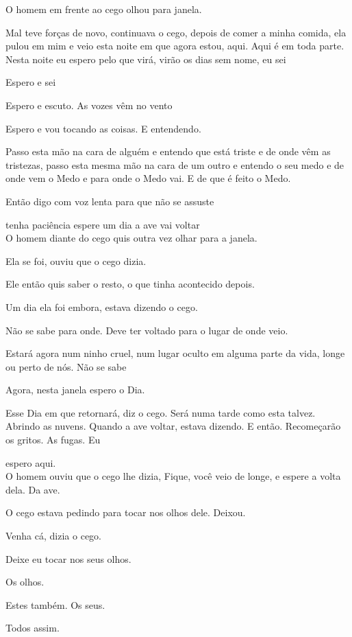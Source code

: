 O homem em frente ao cego olhou para janela.

Mal teve forças de novo, continuava o cego, depois de comer a minha
comida, ela pulou em mim e veio esta noite em que agora estou, aqui.
Aqui é em toda parte. Nesta noite eu espero pelo que virá, virão os dias
sem nome, eu sei

Espero e sei

Espero e escuto. As vozes vêm no vento

Espero e vou tocando as coisas. E entendendo.

Passo esta mão na cara de alguém e entendo que está triste e de onde vêm
as tristezas, passo esta mesma mão na cara de um outro e entendo o seu
medo e de onde vem o Medo e para onde o Medo vai. E de que é feito o
Medo.

Então digo com voz lenta para que não se assuste

tenha paciência espere um dia a ave vai voltar\\

O homem diante do cego quis outra vez olhar para a janela.

Ela se foi, ouviu que o cego dizia.

Ele então quis saber o resto, o que tinha acontecido depois.

Um dia ela foi embora, estava dizendo o cego.

Não se sabe para onde. Deve ter voltado para o lugar de onde veio.

Estará agora num ninho cruel, num lugar oculto em alguma parte da vida,
longe ou perto de nós. Não se sabe

Agora, nesta janela espero o Dia.

Esse Dia em que retornará, diz o cego. Será numa tarde como esta talvez.
Abrindo as nuvens. Quando a ave voltar, estava dizendo. E então.
Recomeçarão os gritos. As fugas. Eu

espero aqui.\\

O homem ouviu que o cego lhe dizia, Fique, você veio de longe, e espere
a volta dela. Da ave.

O cego estava pedindo para tocar nos olhos dele. Deixou.

Venha cá, dizia o cego.

Deixe eu tocar nos seus olhos.

Os olhos.

Estes também. Os seus.

Todos assim.

